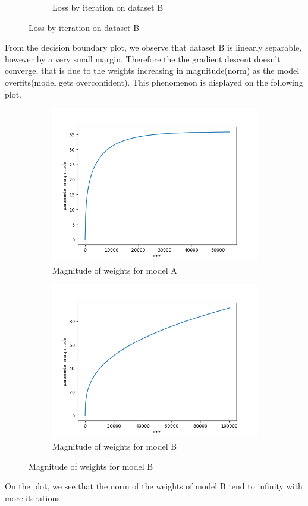 \begin{answer}
\begin{figure}[H]
\begin{subfigure}[b]{0.49\textwidth}
    \caption*{Loss by iteration on dataset B}
  \end{subfigure}
\end{figure}
From the decision boundary plot, we observe that dataset B is linearly separable, however by a very small margin. Therefore the the gradient descent doesn't converge, that is due to the weights increasing in magnitude(norm) as the model overfits(model gets overconfident). This phenomenon is displayed on the following plot.
\begin{figure}[H]
  \centering
  \begin{subfigure}[b]{0.49\textwidth}
    \includegraphics[width=\textwidth]{logreg_stability/logreg_pred_a_param_magnitude.png}
    \caption*{Magnitude of weights for model A}
  \end{subfigure}
  \begin{subfigure}[b]{0.49\textwidth}
    \includegraphics[width=\textwidth]{logreg_stability/logreg_pred_b_param_magnitude.png}
    \caption*{Magnitude of weights for model B}
  \end{subfigure}
\end{figure}
On the plot, we see that the norm of the weights of model B tend to infinity with more iterations.
\end{answer}
